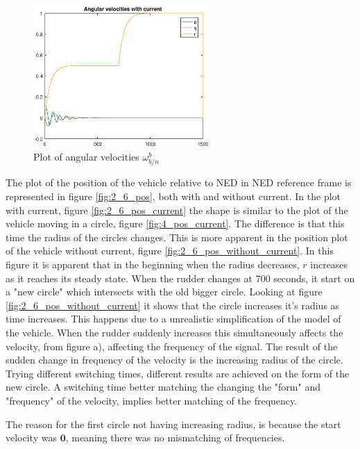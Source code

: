 \begin{figure}[!ht]
	\centering
	\includegraphics[width=0.6\textwidth]{figures/2_6_ang_vel.eps}
	\caption{Plot of angular velocities $\omega^b_{b/n}$}
	\label{fig:2_6_ang_vel}
\end{figure}

The plot of the position of the vehicle relative to NED in NED reference frame is represented in figure \ref{fig:2_6_pos}, both with and without current. In the plot with current, figure \ref{fig:2_6_pos_current} the shape is similar to the plot of the vehicle moving in a circle, figure \ref{fig:4_pos_current}. The difference is that this time the radius of the circles changes. This is more apparent in the position plot of the vehicle without current, figure \ref{fig:2_6_pos_without_current}. In this figure it is apparent that  in the beginning when the radius decreases, $r$ increases as it reaches its steady state. When the rudder changes at 700 seconds, it start on a "new circle" which intersects with the old bigger circle. Looking at figure \ref{fig:2_6_pos_without_current} it shows that the circle increases it's radius as time increases. This happens due to a unrealistic simplification of the model of the vehicle. When the rudder suddenly increases this simultaneously affects the velocity, from figure  a), affecting the frequency of the signal. The result of the sudden change in frequency of the velocity is the increasing radius of the circle. Trying different switching times, different results are achieved on the form of the new circle. A switching time better matching the changing the "form" and "frequency" of the velocity, implies better matching of the frequency.  

The reason for the first circle not having increasing radius, is because the start velocity was $\mathbf{0}$, meaning there was no mismatching of frequencies.  

